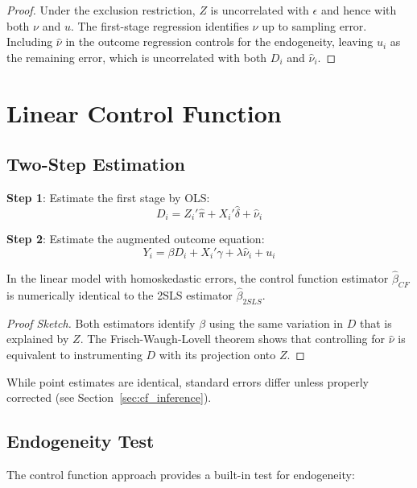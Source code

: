 \begin{proof}
Under the exclusion restriction, $Z$ is uncorrelated with $\epsilon$ and hence with both $\nu$ and $u$. The first-stage regression identifies $\nu$ up to sampling error. Including $\hat{\nu}$ in the outcome regression controls for the endogeneity, leaving $u_i$ as the remaining error, which is uncorrelated with both $D_i$ and $\hat{\nu}_i$.
\end{proof}


\section{Linear Control Function}
\label{sec:cf_linear}

\subsection{Two-Step Estimation}

\textbf{Step 1}: Estimate the first stage by OLS:
\[
D_i = Z_i'\hat{\pi} + X_i'\hat{\delta} + \hat{\nu}_i
\]

\textbf{Step 2}: Estimate the augmented outcome equation:
\[
Y_i = \beta D_i + X_i'\gamma + \lambda \hat{\nu}_i + u_i
\]

\begin{theorem}
\label{thm:cf_2sls_equivalence}
In the linear model with homoskedastic errors, the control function estimator $\hat{\beta}_{CF}$ is numerically identical to the 2SLS estimator $\hat{\beta}_{2SLS}$.
\end{theorem}

\begin{proof}[Proof Sketch]
Both estimators identify $\beta$ using the same variation in $D$ that is explained by $Z$. The Frisch-Waugh-Lovell theorem shows that controlling for $\hat{\nu}$ is equivalent to instrumenting $D$ with its projection onto $Z$.
\end{proof}

\begin{remark}
While point estimates are identical, standard errors differ unless properly corrected (see Section~\ref{sec:cf_inference}).
\end{remark}

\subsection{Endogeneity Test}

The control function approach provides a built-in test for endogeneity:

